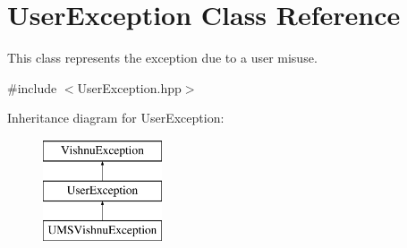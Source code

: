 \hypertarget{classUserException}{
\section{UserException Class Reference}
\label{classUserException}
}


This class represents the exception due to a user misuse.  




{\ttfamily \#include $<$UserException.hpp$>$}

Inheritance diagram for UserException:\begin{figure}[H]
\begin{center}
\leavevmode
\includegraphics[height=3.000000cm]{classUserException}
\end{center}
\end{figure}
